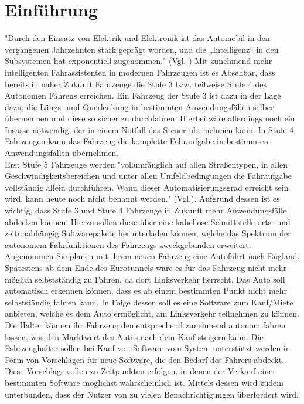 \section{Einführung}
"Durch den Einsatz von Elektrik und Elektronik ist das Automobil in den vergangenen
Jahrzehnten stark geprägt worden, und die „Intelligenz“ in den Subsystemen hat exponentiell zugenommen." (Vgl. \cite[S. 1]{uniStuttgart}) Mit zunehmend mehr intelligenten Fahrassistenten in modernen Fahrzeugen ist es Absehbar, dass bereits in naher Zukunft Fahrzeuge die Stufe 3 bzw. teilweise Stufe 4 des Autonomen Fahrens erreichen. Ein Fahrzeug der Stufe 3 ist dazu in der Lage dazu, die Längs- und Querlenkung in bestimmten Anwendungsfällen selber übernehmen und diese so sicher zu durchfahren. Hierbei wäre allerdings noch ein Insasse notwendig, der in einem Notfall das Steuer übernehmen kann. In Stufe 4 Fahrzeugen kann das Fahrzeug die komplette Fahraufgabe in bestimmten Anwendungsfällen übernehmen.\cite[S.\, 14]{vda}\\

Erst Stufe 5 Fahrzeuge werden "vollumfänglich auf allen Straßentypen, in allen Geschwindigkeitsbereichen und unter allen Umfeldbedingungen die Fahraufgabe vollständig allein durchführen. Wann dieser Automatisierungsgrad erreicht sein wird, kann heute noch nicht benannt werden." (Vgl.\cite[S. 14]{vda}). Aufgrund dessen ist es wichtig, dass Stufe 3 und Stufe 4 Fahrzeuge in Zukunft mehr Anwendungsfälle abdecken können. Hierzu sollen diese über eine kabellose Schnittstelle orts- und zeitunabhängig Softwarepakete herunterladen können, welche das Spektrum der autonomem Fahrfunktionen des Fahrzeugs zweckgebunden erweitert. Angenommen Sie planen mit ihrem neuen Fahrzeug eine Autofahrt nach England. Spätestens ab dem Ende des Eurotunnels wäre es für das Fahrzeug nicht mehr möglich selbstständig zu Fahren, da dort Linksverkehr herrscht. Das Auto soll automatisch erkennen können, dass es ab einem bestimmten Punkt nicht mehr selbstständig fahren kann. In Folge dessen soll es eine Software zum Kauf/Miete anbieten, welche es dem Auto ermöglicht, am Linksverkehr teilnehmen zu können. Die Halter können ihr Fahrzeug dementsprechend zunehmend autonom fahren lassen, was den Marktwert des Autos nach dem Kauf steigern kann. Die Fahrzeughalter sollen bei Kauf von Software vom System unterstützt werden in Form von Vorschlägen für neue Software, die den Bedarf des Fahrers abdeckt. Diese Vorschläge sollen zu Zeitpunkten erfolgen, in denen der Verkauf einer bestimmten Software möglichst wahrscheinlich ist. Mittels dessen wird zudem unterbunden, dass der Nutzer von zu vielen Benachrichtigungen überfordert wird.\\

